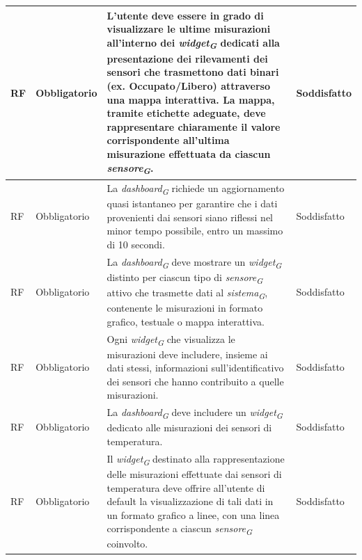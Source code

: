 \begin{longtable}{|C{1.5cm}|C{2cm}|L{5cm}|C{2cm}|}
    \hline
     RF & Obbligatorio &  L'utente deve essere in grado di visualizzare le ultime misurazioni all'interno dei \textit{widget}\textsubscript{\textit{G}} dedicati alla presentazione dei rilevamenti dei sensori che trasmettono dati binari (ex. Occupato/Libero) attraverso una mappa interattiva. La mappa, tramite etichette adeguate, deve rappresentare chiaramente il valore corrispondente all'ultima misurazione effettuata da ciascun \textit{sensore}\textsubscript{\textit{G}}.& Soddisfatto \\
    
    \hline
     RF & Obbligatorio & La \textit{dashboard}\textsubscript{\textit{G}} richiede un aggiornamento quasi istantaneo per garantire che i dati provenienti dai sensori siano riflessi nel minor tempo possibile, entro un massimo di 10 secondi.& Soddisfatto \\
    
    \hline
     RF & Obbligatorio & La \textit{dashboard}\textsubscript{\textit{G}} deve mostrare un \textit{widget}\textsubscript{\textit{G}} distinto per ciascun tipo di \textit{sensore}\textsubscript{\textit{G}} attivo che trasmette dati al \textit{sistema}\textsubscript{\textit{G}}, contenente le misurazioni in formato grafico, testuale o mappa interattiva.& Soddisfatto \\
    
    \hline
     RF & Obbligatorio & Ogni \textit{widget}\textsubscript{\textit{G}} che visualizza le misurazioni deve includere, insieme ai dati stessi, informazioni sull'identificativo dei sensori che hanno contribuito a quelle misurazioni.& Soddisfatto \\
    
    \hline
     RF & Obbligatorio & La \textit{dashboard}\textsubscript{\textit{G}} deve includere un \textit{widget}\textsubscript{\textit{G}} dedicato alle misurazioni dei sensori di temperatura.& Soddisfatto \\
    
    \hline
     RF & Obbligatorio &Il \textit{widget}\textsubscript{\textit{G}} destinato alla rappresentazione delle misurazioni effettuate dai sensori di temperatura deve offrire all'utente di default la visualizzazione di tali dati in un formato grafico a linee, con una linea corrispondente a ciascun \textit{sensore}\textsubscript{\textit{G}} coinvolto.& Soddisfatto \\
    

\end{longtable}

